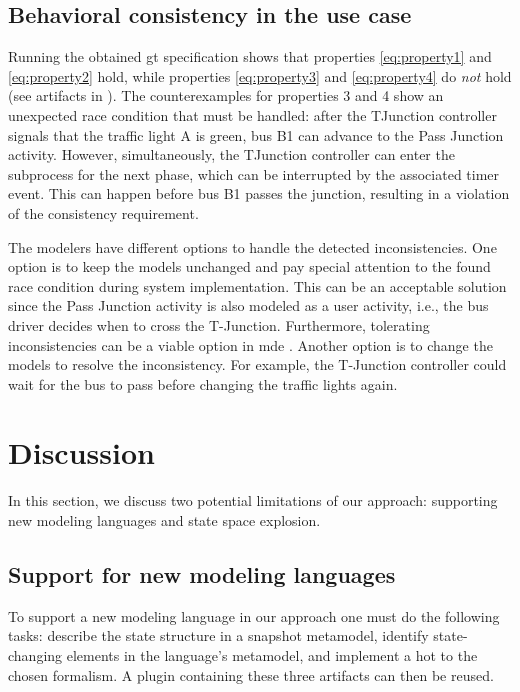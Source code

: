 \documentclass{jot}
\begin{document}
\subsection{Behavioral consistency in the use case}
Running the obtained \gls*{gt} specification shows that properties \eqref{eq:property1} and \eqref{eq:property2} hold, while properties \eqref{eq:property3} and \eqref{eq:property4} do \textit{not} hold (see artifacts in \cite{krauterArtifactsBehavioralConsistency2023}).
The counterexamples for properties 3 and 4 show an unexpected race condition that must be handled:
after the TJunction controller signals that the traffic light A is green, bus B1 can advance to the \textsf{Pass Junction} activity.
However, simultaneously, the TJunction controller can enter the subprocess for the next phase, which can be interrupted by the associated timer event.
This can happen before bus B1 passes the junction, resulting in a violation of the consistency requirement.

The modelers have different options to handle the detected inconsistencies.
One option is to keep the models unchanged and pay special attention to the found race condition during system implementation.
This can be an acceptable solution since the \textsf{Pass Junction} activity is also modeled as a user activity, i.e., the bus driver decides when to cross the T-Junction.
Furthermore, tolerating inconsistencies can be a viable option in \gls*{mde} \cite{weidmannToleranceModelDrivenEngineering2021}.
Another option is to change the models to resolve the inconsistency.
For example, the T-Junction controller could wait for the bus to pass before changing the traffic lights again.


\section{Discussion} \label{sec:discussion}
In this section, we discuss two potential limitations of our approach: supporting new modeling languages and state space explosion.

\subsection{Support for new modeling languages}
To support a new modeling language in our approach one must do the following tasks: describe the state structure in a snapshot metamodel, identify state-changing elements in the language's metamodel, and implement a \gls*{hot} to the chosen formalism.
A plugin containing these three artifacts can then be reused.
\end{document}
